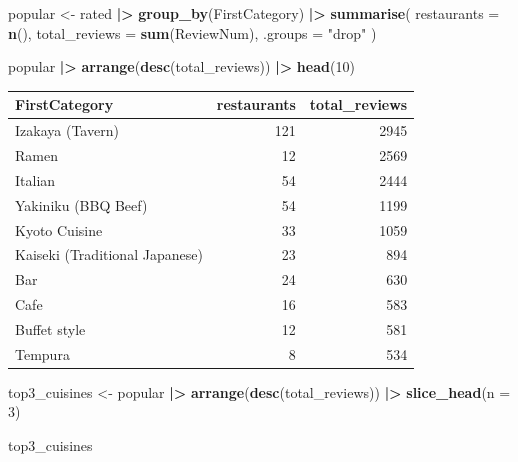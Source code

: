 \documentclass[
]{article}
\newenvironment{Shaded}{\begin{snugshade}}{\end{snugshade}}
\newcommand{\AttributeTok}[1]{\textcolor[rgb]{0.13,0.29,0.53}{#1}}
\newcommand{\DecValTok}[1]{\textcolor[rgb]{0.00,0.00,0.81}{#1}}
\newcommand{\FunctionTok}[1]{\textcolor[rgb]{0.13,0.29,0.53}{\textbf{#1}}}
\newcommand{\NormalTok}[1]{#1}
\newcommand{\OtherTok}[1]{\textcolor[rgb]{0.56,0.35,0.01}{#1}}
\newcommand{\SpecialCharTok}[1]{\textcolor[rgb]{0.81,0.36,0.00}{\textbf{#1}}}
\newcommand{\StringTok}[1]{\textcolor[rgb]{0.31,0.60,0.02}{#1}}
\newcounter{none} %
\begin{document}
\begin{Shaded}
\begin{Highlighting}[]
\NormalTok{popular }\OtherTok{\textless{}{-}}\NormalTok{ rated }\SpecialCharTok{|\textgreater{}}
  \FunctionTok{group\_by}\NormalTok{(FirstCategory) }\SpecialCharTok{|\textgreater{}}
  \FunctionTok{summarise}\NormalTok{(}
    \AttributeTok{restaurants   =} \FunctionTok{n}\NormalTok{(),}
    \AttributeTok{total\_reviews =} \FunctionTok{sum}\NormalTok{(ReviewNum),}
    \AttributeTok{.groups =} \StringTok{"drop"}
\NormalTok{  )}

\NormalTok{popular }\SpecialCharTok{|\textgreater{}} \FunctionTok{arrange}\NormalTok{(}\FunctionTok{desc}\NormalTok{(total\_reviews)) }\SpecialCharTok{|\textgreater{}} \FunctionTok{head}\NormalTok{(}\DecValTok{10}\NormalTok{)}
\end{Highlighting}
\end{Shaded}

{\def\LTcaptype{none} %
\begin{longtable}[]{@{}lrr@{}}
\toprule\noalign{}
FirstCategory & restaurants & total\_reviews \\
\midrule\noalign{}
\endhead
\bottomrule\noalign{}
\endlastfoot
Izakaya (Tavern) & 121 & 2945 \\
Ramen & 12 & 2569 \\
Italian & 54 & 2444 \\
Yakiniku (BBQ Beef) & 54 & 1199 \\
Kyoto Cuisine & 33 & 1059 \\
Kaiseki (Traditional Japanese) & 23 & 894 \\
Bar & 24 & 630 \\
Cafe & 16 & 583 \\
Buffet style & 12 & 581 \\
Tempura & 8 & 534 \\
\end{longtable}
}

\begin{Shaded}
\begin{Highlighting}[]
\NormalTok{top3\_cuisines }\OtherTok{\textless{}{-}}\NormalTok{ popular }\SpecialCharTok{|\textgreater{}}
  \FunctionTok{arrange}\NormalTok{(}\FunctionTok{desc}\NormalTok{(total\_reviews)) }\SpecialCharTok{|\textgreater{}}
  \FunctionTok{slice\_head}\NormalTok{(}\AttributeTok{n =} \DecValTok{3}\NormalTok{)}

\NormalTok{top3\_cuisines}
\end{Highlighting}
\end{Shaded}
\end{document}
